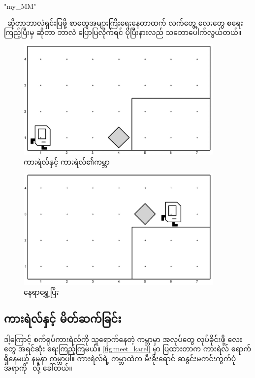 
\chapter{}
\XeTeXlinebreaklocale "my_MM"  %
\begin{sloppypar}



\enprogramming\ ဆိုတာဘာလဲရှင်းပြဖို့ စာတွေအများကြီးရေးနေတာထက် လက်တွေ့ \enprogram လေးတွေ စရေးကြည့်ပြီးမှ \mmprogramming ဆိုတာ ဘာလဲ ပြောပြလိုက်ရင် ပိုပြီးနားလည် သဘောပေါက်လွယ်တယ်။ 

\begin{figure}[h]
    \caption{ကားရဲလ်နှင့်  ကားရဲလ်၏ကမ္ဘာ}\label{fig:meet_karel}
    \includegraphics[width=4in, left]{ch01/meet_karel.jpg}
\end{figure}

\begin{figure}[tbh!]
    \caption{\mmbeeper နေရာရွှေ့ပြီး}\label{fig:meet_karel_aft}
    \includegraphics[width=4in, left]{ch01/meet_karel_aft.jpg}
\end{figure}

\section{ကားရဲလ်နှင့် မိတ်ဆက်ခြင်း}
ဒါ့ကြောင့် စက်ရုပ်ကားရဲလ်ကို သူရောက်နေတဲ့ ကမ္ဘာမှာ အလုပ်တွေ လုပ်ခိုင်းဖို့ \mmprogram လေးတွေ  အရင်ဆုံး ရေးကြည့်ကြမယ်။ \Fig \vref*{fig:meet_karel} မှာ ပြထားတာက ကားရဲလ် ရောက်ရှိနေမယ့် နမူနာ ကမ္ဘာပါ။ ကားရဲလ်ရဲ့ ကမ္ဘာထဲက မီးခိုးရောင် ဆနွင်းမကင်းကွက်ပုံ အရာကို \enbeeper\ လို့ ခေါ်တယ်။ 


\end{sloppypar}
